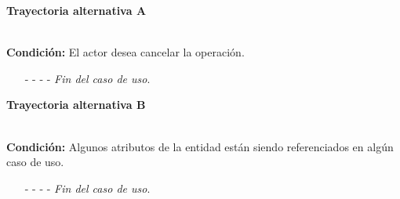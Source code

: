 	\hypertarget{CU7-1-1-3:TAA}{\textbf{Trayectoria alternativa A}}\\
	\noindent \textbf{Condición:} El actor desea cancelar la operación.
	\begin{enumerate}
		\UCpaso[\UCactor] Oprime el botón  de la pantalla emergente.
		\UCpaso[\UCsist] Muestra la pantalla .
		\item[- -] - - {\em {Fin del caso de uso}}.%
	\end{enumerate}

	\hypertarget{CU7-1-1-3:TAB}{\textbf{Trayectoria alternativa B}}\\
	\noindent \textbf{Condición:} Algunos atributos de la entidad están siendo referenciados en algún caso de uso.
	\begin{enumerate}
		\UCpaso[\UCsist] Muestra el mensaje  en la pantalla .
		\item[- -] - - {\em {Fin del caso de uso}}.
	\end{enumerate}
